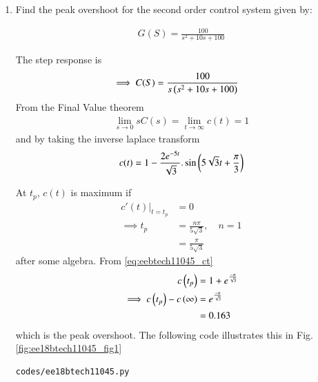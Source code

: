 \begin{enumerate}[label=\thesubsection.\arabic*.,ref=\thesubsection.\theenumi]

\item Find the peak overshoot for the second order control system given by:

\begin{align}
    G(S) = \frac{100}{s^2 + 10s +100}
\end{align}

\solution  The step response is
\begin{align}
    \implies C(S) &= \frac{100}{s\left(s^2 + 10s +100\right)}
\end{align}
From the Final Value theorem
\begin{align}
    \lim_{s \to 0} sC(s) = \lim_{t \to \infty} c(t) = 1
\end{align}
%
and by taking the inverse laplace transform
\begin{align}
    c(t) = 1 - \frac{2e^{-5t}}{\sqrt{3}}.\sin \left(5\sqrt{3}t + \frac{\pi}{3}\right)
    \label{eq:eebtech11045_ct}
\end{align}


At $t_p$, $c(t)$ is maximum if
\begin{align}
    c'(t)|_{t=t_p} &= 0
\\
\implies      t_p &= \frac{n\pi}{5\sqrt{3}}, \quad n = 1
\\
&= \frac{\pi}{5\sqrt{3}}
\end{align}
%
after some algebra.
From \eqref{eq:eebtech11045_ct} 
\begin{align}
    c\left(t_p\right) &= 1 + e^\frac{-\pi}{\sqrt{3}} 
\\
\implies     c\left(t_p\right)  -     c\left(\infty\right) &= e^\frac{-\pi}{\sqrt{3}} 
\\
&=0.163
\end{align}
%
which is the peak overshoot.  The following code illustrates this in Fig.     \ref{fig:ee18btech11045_fig1}


\begin{lstlisting}
codes/ee18btech11045.py
\end{lstlisting}


\end{enumerate}
